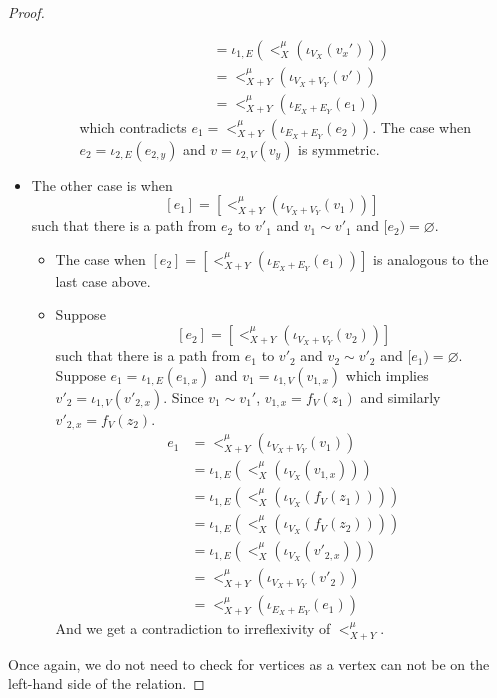 \begin{proof}
\begin{itemize}
\begin{itemize}
\begin{itemize}
\begin{align*}
                                                            &= \iota_{1,E}(<_{X}^{\mu}(\iota_{V_{X}}(v_{x}')))\\
                                                            &= <_{X+Y}^{\mu}(\iota_{V_{X} + V_{Y}}(v'))\\
                                                            &= <_{X+Y}^{\mu}(\iota_{E_{X} + E_{Y}}(e_1))
                \end{align*}
                which contradicts $e_1 = <_{X+Y}^{\mu}(\iota_{E_{X} + E_{Y}}(e_2))$.
                The case when $e_2 = \iota_{2,E}(e_{2,y})$ and $v = \iota_{2,V}(v_{y})$ is symmetric.
            \end{itemize}
        \end{itemize}
            \item The other case is when          
            \[
                [e_1] = [<_{X+Y}^{\mu}(\iota_{V_{X} + V_{Y}}(v_1))]
            \]
            such that there is a path from $e_2$ to $v'_1$ and $v_1 \sim v'_1$ and $[e_2) = \varnothing$.
            \begin{itemize}
                \item The case when $[e_2] = [<_{X+Y}^{\mu}(\iota_{E_{X} + E_{Y}}(e_1))]$ is analogous to the last case above.
                \item Suppose 
                \[
                    [e_2] = [<_{X+Y}^{\mu}(\iota_{V_{X} + V_{Y}}(v_2))]
                \] such that there is a path from $e_1$ to $v'_2$ and $v_2 \sim v'_2$ and $[e_1) = \varnothing$.
                    Suppose $e_1 = \iota_{1,E}(e_{1,x})$ and $v_1 = \iota_{1,V}(v_{1,x})$ which implies $v'_2 = \iota_{1,V}(v'_{2,x})$.
                    Since $v_1 \sim v_1'$, $v_{1,x} = f_{V}(z_1)$ and similarly $v'_{2,x} = f_{V}(z_2)$.
                    \begin{align*}
                        e_1 &= <_{X+Y}^{\mu}(\iota_{V_{X} + V_{Y}}(v_1))\\
                            &= \iota_{1,E}(<_{X}^{\mu}(\iota_{V_{X}}(v_{1,x})))\\
                            &= \iota_{1,E}(<_{X}^{\mu}(\iota_{V_{X}}(f_{V}(z_1))))\\
                            &= \iota_{1,E}(<_{X}^{\mu}(\iota_{V_{X}}(f_{V}(z_2))))\\
                            &= \iota_{1,E}(<_{X}^{\mu}(\iota_{V_{X}}(v'_{2,x})))\\
                            &= <_{X+Y}^{\mu}(\iota_{V_{X} + V_{Y}}(v'_2))\\
                            &= <_{X+Y}^{\mu}(\iota_{E_{X} + E_{Y}}(e_1))
                    \end{align*}
                    And we get a contradiction to irreflexivity of $<_{X+Y}^{\mu}$.
            \end{itemize}
      \end{itemize} 
    Once again, we do not need to check for vertices as a vertex can not be on the left-hand side of the relation.
\end{proof}


